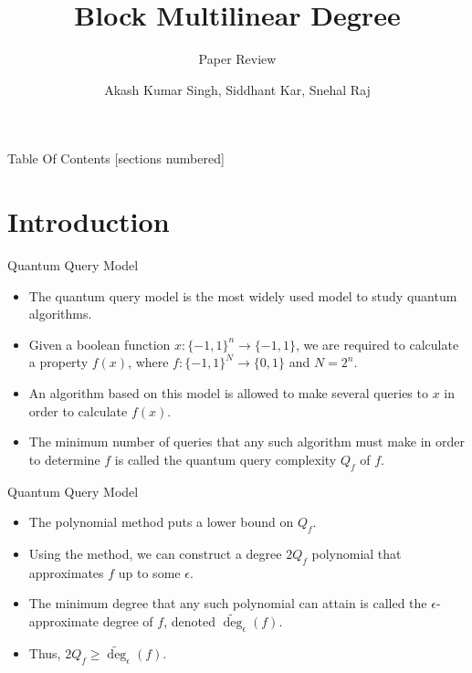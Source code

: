 \documentclass[10pt]{beamer}
\title{Block Multilinear Degree}
\subtitle{Paper Review}
\date{}
\author{Akash Kumar Singh, Siddhant Kar, Snehal Raj}
\institute{IIT Kanpur}
\begin{document}
\maketitle

\begin{frame}{Table Of Contents}
  [sections numbered]
  \tableofcontents[hideallsubsections]
\end{frame}

\section{Introduction}

\begin{frame}[fragile]{Quantum Query Model}
\begin{itemize}
    \item The quantum query model is the most widely used model to study quantum algorithms.
    \item Given a boolean function $x\colon \{-1,1\}^n\rightarrow \{-1,1\}$, we are required to calculate a property $f(x)$, where $f\colon \{-1,1\}^N\rightarrow \{0,1\}$ and $N = 2^n$.
    \item An algorithm based on this model is allowed to make several queries to $x$ in order to calculate $f(x)$.
    \item The minimum number of queries that any such algorithm must make in order to determine $f$ is called the quantum query complexity $Q_f$ of $f$.
\end{itemize}
\end{frame} 

\begin{frame}{Quantum Query Model}
\begin{itemize}
    \item The polynomial method puts a lower bound on $Q_f$.
    \item Using the method, we can construct a degree $2Q_f$ polynomial that approximates $f$ up to some $\epsilon$.
    \item The minimum degree that any such polynomial can attain is called the $\epsilon$-approximate degree of $f$, denoted $\widetilde{\deg}_\epsilon(f)$.
    \item Thus, $2Q_f \geq \widetilde{\deg}_\epsilon(f)$.
\end{itemize}
\end{frame} 
\end{document}
